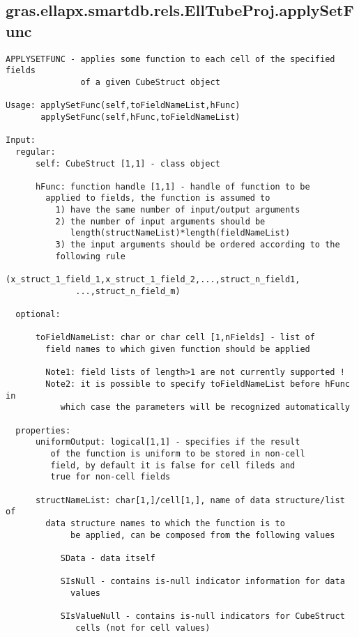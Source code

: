 \subsection{\texorpdfstring{gras.ellapx.smartdb.rels.EllTubeProj.applySetFunc}{applySetFunc}}\label{method:gras.ellapx.smartdb.rels.EllTubeProj.applySetFunc}
\begin{verbatim}
APPLYSETFUNC - applies some function to each cell of the specified fields
               of a given CubeStruct object

Usage: applySetFunc(self,toFieldNameList,hFunc)
       applySetFunc(self,hFunc,toFieldNameList)

Input:
  regular:
      self: CubeStruct [1,1] - class object

      hFunc: function handle [1,1] - handle of function to be
        applied to fields, the function is assumed to
          1) have the same number of input/output arguments
          2) the number of input arguments should be
             length(structNameList)*length(fieldNameList)
          3) the input arguments should be ordered according to the
          following rule
              (x_struct_1_field_1,x_struct_1_field_2,...,struct_n_field1,
              ...,struct_n_field_m)

  optional:

      toFieldNameList: char or char cell [1,nFields] - list of
        field names to which given function should be applied

        Note1: field lists of length>1 are not currently supported !
        Note2: it is possible to specify toFieldNameList before hFunc in
           which case the parameters will be recognized automatically

  properties:
      uniformOutput: logical[1,1] - specifies if the result
         of the function is uniform to be stored in non-cell
         field, by default it is false for cell fileds and
         true for non-cell fields

      structNameList: char[1,]/cell[1,], name of data structure/list of
        data structure names to which the function is to
             be applied, can be composed from the following values

           SData - data itself

           SIsNull - contains is-null indicator information for data
             values

           SIsValueNull - contains is-null indicators for CubeStruct
              cells (not for cell values)


\end{verbatim}
